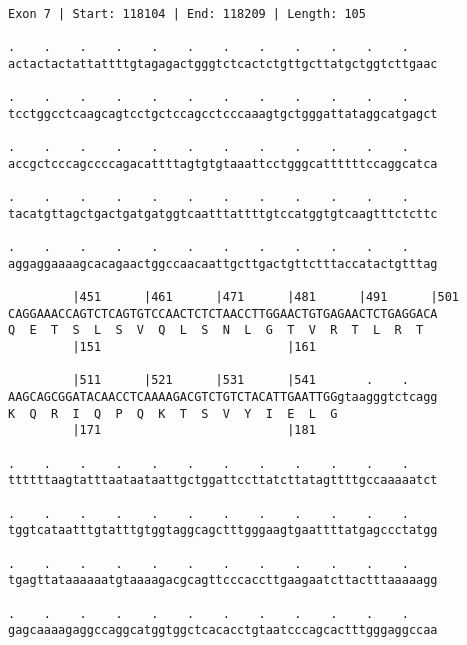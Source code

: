 \documentclass{article}
\begin{document}
\begin{Verbatim}
Exon 7 | Start: 118104 | End: 118209 | Length: 105
 
.    .    .    .    .    .    .    .    .    .    .    .    
actactactattattttgtagagactgggtctcactctgttgcttatgctggtcttgaac
                                                            
.    .    .    .    .    .    .    .    .    .    .    .    
tcctggcctcaagcagtcctgctccagcctcccaaagtgctgggattataggcatgagct
                                                            
.    .    .    .    .    .    .    .    .    .    .    .    
accgctcccagccccagacattttagtgtgtaaattcctgggcattttttccaggcatca
                                                            
.    .    .    .    .    .    .    .    .    .    .    .    
tacatgttagctgactgatgatggtcaatttattttgtccatggtgtcaagtttctcttc
                                                            
.    .    .    .    .    .    .    .    .    .    .    .    
aggaggaaaagcacagaactggccaacaattgcttgactgttctttaccatactgtttag
                                                            
         |451      |461      |471      |481      |491      |501
CAGGAAACCAGTCTCAGTGTCCAACTCTCTAACCTTGGAACTGTGAGAACTCTGAGGACA
Q  E  T  S  L  S  V  Q  L  S  N  L  G  T  V  R  T  L  R  T  
         |151                          |161                 
  
         |511      |521      |531      |541       .    .    
AAGCAGCGGATACAACCTCAAAAGACGTCTGTCTACATTGAATTGGgtaagggtctcagg
K  Q  R  I  Q  P  Q  K  T  S  V  Y  I  E  L  G              
         |171                          |181                 
  
.    .    .    .    .    .    .    .    .    .    .    .    
ttttttaagtatttaataataattgctggattccttatcttatagttttgccaaaaatct
                                                            
.    .    .    .    .    .    .    .    .    .    .    .    
tggtcataatttgtatttgtggtaggcagctttgggaagtgaattttatgagccctatgg
                                                            
.    .    .    .    .    .    .    .    .    .    .    .    
tgagttataaaaaatgtaaaagacgcagttcccaccttgaagaatcttactttaaaaagg
                                                            
.    .    .    .    .    .    .    .    .    .    .    .    
gagcaaaagaggccaggcatggtggctcacacctgtaatcccagcactttgggaggccaa
                                                            

\end{Verbatim}
\end{document}
